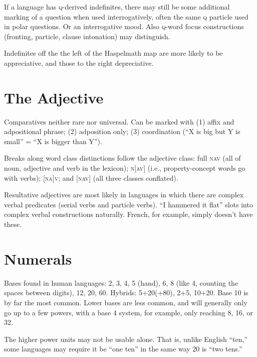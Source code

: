 \documentclass[11pt]{article}
\newcommand{\I}[1]{\textsc{#1}}   %
\begin{document}
If a language has \I{q}-derived indefinites, there may still be some
additional marking of a question when used interrogatively, often the
same \I{q} particle used in polar questions.  Or an interrogative
mood.  Also \I{q}-word focus constructions (fronting, particle, clause
intonation) may distinguish.

Indefinites off the the left of the Haspelmath map are more likely to
be appreciative, and those to the right depreciative.



\section{The Adjective}
Comparatives neither rare nor universal.  Can be marked with (1) affix
and adpositional phrase; (2) adposition only; (3) coordination (``X is
big but Y is small'' = ``X is bigger than Y'').

Breaks along word class distinctions follow the adjective class: full
\I{nav} (all of noun, adjective and verb in the lexicon); \I{n[av]}
(i.e., property-concept words go with verbs); \I{[na]v}; and \I{[nav]}
(all three classes conflated).

Resultative adjectives are most likely in languages in which there are
complex verbal predicates (serial verbs and particle verbs). ``I
hammered it flat'' slots into complex verbal constructions naturally.
French, for example, simply doesn't have these.


\section{Numerals}
Bases found in human languages: 2, 3, 4, 5 (hand), 6, 8 (like 4,
counting the spaces between digits), 12, 20, 60.  Hybrids: 5+20(+80),
2+5, 10+20.  Base 10 is by far the most common.  Lower bases are less
common, and will generally only go up to a few powers, with a base 4
system, for example, only reaching 8, 16, or 32.

The higher power units may not be usable alone. That is, unlike
English ``ten,'' some languages may require it be ``one ten'' in the
same way 20 is ``two tens.''
\end{document}
